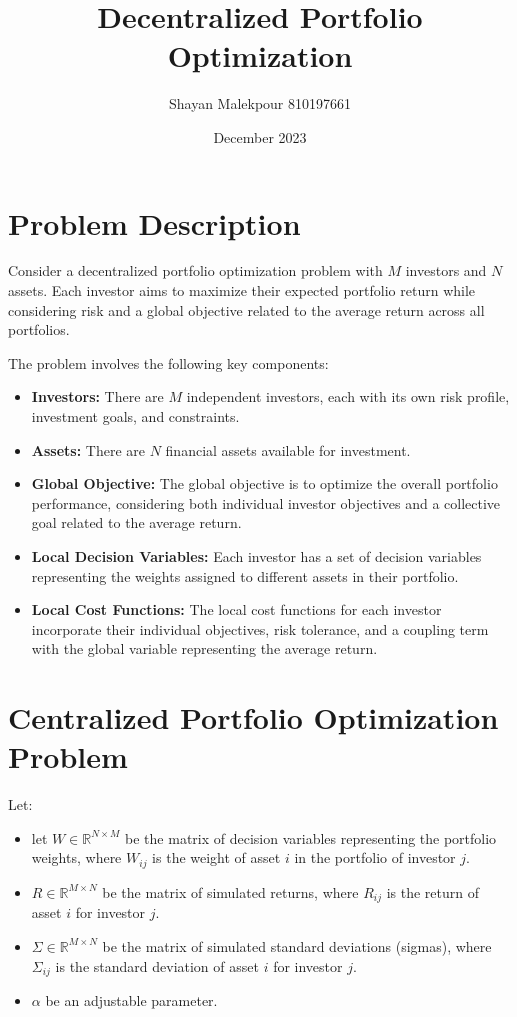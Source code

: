 \documentclass{article}
\begin{document}
	
	\title{Decentralized Portfolio Optimization}
	\author{Shayan Malekpour 	810197661}

	\date{December 2023}
	\maketitle
	
	\section*{Problem Description}
	
	Consider a decentralized portfolio optimization problem with $M$ investors and $N$ assets. Each investor aims to maximize their expected portfolio return while considering risk and a global objective related to the average return across all portfolios.
	
	The problem involves the following key components:
	
	\begin{itemize}
		\item \textbf{Investors:} There are $M$ independent investors, each with its own risk profile, investment goals, and constraints.
		\item \textbf{Assets:} There are $N$ financial assets available for investment.
		\item \textbf{Global Objective:} The global objective is to optimize the overall portfolio performance, considering both individual investor objectives and a collective goal related to the average return.
		\item \textbf{Local Decision Variables:} Each investor has a set of decision variables representing the weights assigned to different assets in their portfolio.
		\item \textbf{Local Cost Functions:} The local cost functions for each investor incorporate their individual objectives, risk tolerance, and a coupling term with the global variable representing the average return.
	\end{itemize}
	
		\section*{Centralized Portfolio Optimization Problem}
	Let:
	\begin{itemize}
		\item let $W \in \mathbb{R}^{N \times M}$ be the matrix of decision variables representing the portfolio weights, where $W_{ij}$ is the weight of asset $i$ in the portfolio of investor $j$.
		\item $R \in \mathbb{R}^{M \times N}$ be the matrix of simulated returns, where $R_{ij}$ is the return of asset $i$ for investor $j$.
		\item $\Sigma \in \mathbb{R}^{M \times N}$ be the matrix of simulated standard deviations (sigmas), where $\Sigma_{ij}$ is the standard deviation of asset $i$ for investor $j$.
		\item $\alpha$ be an adjustable parameter.
	\end{itemize}
	
\end{document}
